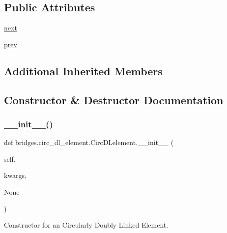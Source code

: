 \subsection*{Public Attributes}
\begin{DoxyCompactItemize}
\item 
\mbox{\hyperlink{classbridges_1_1circ__dl__element_1_1_circ_d_lelement_a0f01f7ff433628bac241d7c069a476fa}{next}}
\item 
\mbox{\hyperlink{classbridges_1_1circ__dl__element_1_1_circ_d_lelement_a78ed845303a07e303bcbb39f015843d0}{prev}}
\end{DoxyCompactItemize}
\subsection*{Additional Inherited Members}


\subsection{Constructor \& Destructor Documentation}
\mbox{\label{classbridges_1_1circ__dl__element_1_1_circ_d_lelement_a9536764f84d69deb9f7e03d6802a71b6}} 
\subsubsection{\texorpdfstring{\+\_\+\+\_\+init\+\_\+\+\_\+()}{\_\_init\_\_()}}
{\footnotesize\ttfamily def bridges.\+circ\+\_\+dl\+\_\+element.\+Circ\+D\+Lelement.\+\_\+\+\_\+init\+\_\+\+\_\+ (\begin{DoxyParamCaption}\item[{}]{self,  }\item[{}]{kwargs,  }\item[{}]{None }\end{DoxyParamCaption})}



Constructor for an Circularly Doubly Linked Element. 


